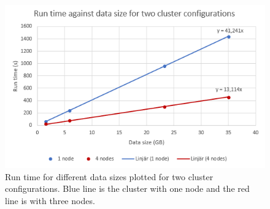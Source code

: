 \begin{figure}[H]
    \centering
    \includegraphics[width=.75\linewidth]{figures/runTime.PNG}
    \caption{Run time for different data sizes plotted for two cluster configurations. Blue line is the cluster with one node and the red line is with three nodes.}
    \label{fig:scalabilityGraph}
\end{figure}

